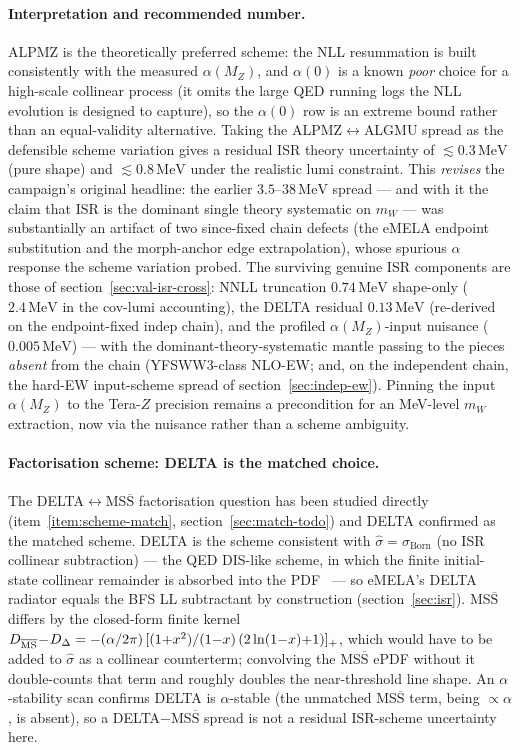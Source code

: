 \documentclass[11pt,a4paper]{article}
\newcommand{\mW}{m_W}
\newcommand{\MeV}{\ensuremath{\,\mathrm{MeV}}}
\begin{document}
\paragraph{Interpretation and recommended number.}
ALPMZ is the theoretically preferred scheme: the NLL resummation is built
consistently with the measured $\alpha(M_Z)$, and $\alpha(0)$ is a known
\emph{poor} choice for a high-scale collinear process (it omits the large
QED running logs the NLL evolution is designed to capture), so the
$\alpha(0)$ row is an extreme bound rather than an equal-validity
alternative. Taking the ALPMZ$\leftrightarrow$ALGMU spread as the
defensible scheme variation gives a residual ISR theory uncertainty of
$\lesssim\!0.3\MeV$ (pure shape) and $\lesssim\!0.8\MeV$ under the
realistic lumi constraint. This \emph{revises} the campaign's original
headline: the earlier $3.5$--$38\MeV$ spread --- and with it the claim
that ISR is the dominant single theory systematic on $\mW$ --- was
substantially an artifact of two since-fixed chain defects
(the eMELA endpoint substitution and the morph-anchor edge
extrapolation), whose spurious $\alpha$ response the scheme variation
probed. The surviving genuine ISR components are those of
section~\ref{sec:val-isr-cross}: NNLL truncation $0.74\MeV$ shape-only
($2.4\MeV$ in the cov-lumi accounting), the DELTA residual $0.13\MeV$
(re-derived on the endpoint-fixed indep chain),
and the profiled $\alpha(M_Z)$-input nuisance ($0.005\MeV$) --- with the
dominant-theory-systematic mantle passing to the pieces \emph{absent}
from the chain (YFSWW3-class NLO-EW; and, on the independent chain, the
hard-EW input-scheme spread of section~\ref{sec:indep-ew}). Pinning the
input $\alpha(M_Z)$ to the Tera-$Z$ precision remains a precondition for
an MeV-level $\mW$ extraction, now via the nuisance rather than a scheme
ambiguity.

\paragraph{Factorisation scheme: DELTA is the matched choice.}
The DELTA$\leftrightarrow$MS$\overline{\text{S}}$ factorisation question has been
studied directly (item~\ref{item:scheme-match}, section~\ref{sec:match-todo}) and
DELTA confirmed as the matched scheme. DELTA is the scheme consistent with
$\hat\sigma=\sigma_\text{Born}$ (no ISR collinear subtraction) --- the QED DIS-like
scheme, in which the finite initial-state collinear remainder is absorbed into the
PDF~\cite{eMELAdelta} --- so eMELA's DELTA radiator equals the BFS LL subtractant by
construction (section~\ref{sec:isr}). MS$\overline{\text{S}}$ differs by the
closed-form finite kernel
$D_{\overline{\rm MS}}\!-\!D_\Delta=-(\alpha/2\pi)\,[(1{+}x^2)/(1{-}x)\,(2\ln(1{-}x){+}1)]_+$,
which would have to be added to $\hat\sigma$ as a collinear counterterm; convolving the
MS$\overline{\text{S}}$ ePDF without it double-counts that term and roughly doubles the
near-threshold line shape. An $\alpha$-stability scan confirms DELTA is $\alpha$-stable
(the unmatched MS$\overline{\text{S}}$ term, being $\propto\alpha$, is absent), so a
DELTA$-$MS$\overline{\text{S}}$ spread is not a residual ISR-scheme uncertainty here.
\end{document}
